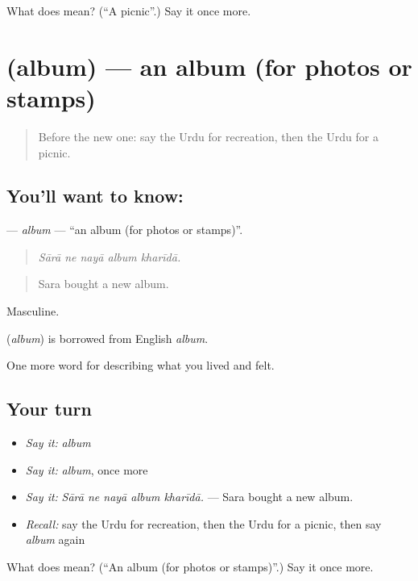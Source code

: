 \begin{tcolorbox}[breakable,colback=teal!4,colframe=teal!35!black,title={Before you move on}]
What does  mean? (\textquotedblleft{}A picnic\textquotedblright{}.) Say it once more.
\end{tcolorbox}
\section[\texorpdfstring{\ur{البم} (album)}{البم (album)}]{ (album) — an album (for photos or stamps)}

\label{lesson:UR-C513-album}



\begin{quote}
Before the new one: say the Urdu for recreation, then the Urdu for a picnic.
\end{quote}

\subsection*{You'll want to know: }
\textbf{} — \emph{album} — \textquotedblleft{}an album (for photos or stamps)\textquotedblright{}.

\begin{quote}
    
\end{quote}

\begin{quote}
\emph{Sārā ne nayā album kharīdā.}
\end{quote}

\begin{quote}
Sara bought a new album.
\end{quote}

Masculine.

\begin{cousinweb}
\textbf{} (\emph{album}) is borrowed from English \emph{album}.
\end{cousinweb}

\begin{grammarlens}[title={What you've built}]
One more word for describing what you lived and felt.
\end{grammarlens}

\subsection*{Your turn}
\begin{itemize}
\raggedright
  \item \emph{Say it:} \emph{album}
  \item \emph{Say it:} \emph{album}, once more
  \item \emph{Say it:} \emph{Sārā ne nayā album kharīdā.} — Sara bought a new album.
  \item \emph{Recall:} say the Urdu for recreation, then the Urdu for a picnic, then say \emph{album} again
\end{itemize}

\begin{tcolorbox}[breakable,colback=teal!4,colframe=teal!35!black,title={Before you move on}]
What does  mean? (\textquotedblleft{}An album (for photos or stamps)\textquotedblright{}.) Say it once more.
\end{tcolorbox}
